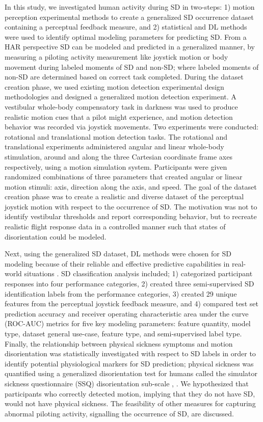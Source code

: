 \documentclass{ieeeaccess}
\begin{document}
\indent In this study, we investigated human activity during SD in two-steps: 1) motion perception experimental methods to create a generalized SD occurrence dataset containing a perceptual feedback measure, and 2) statistical and DL methods were used to identify optimal modeling parameters for predicting SD. From a HAR perspective SD can be modeled and predicted in a generalized manner, by measuring a piloting activity measurement like joystick motion or body movement during labeled moments of SD and non-SD; where labeled moments of non-SD are determined based on correct task completed. During the dataset creation phase, we used existing motion detection experimental design methodologies and designed a generalized motion detection experiment. A vestibular whole-body compensatory task in darkness was used to produce realistic motion cues that a pilot might experience, and motion detection behavior was recorded via joystick movements. Two experiments were conducted: rotational and translational motion detection tasks. The rotational and translational experiments administered angular and linear whole-body stimulation, around and along the three Cartesian coordinate frame axes respectively, using a motion simulation system. Participants were given randomized combinations of three parameters that created angular or linear motion stimuli: axis, direction along the axis, and speed. The goal of the dataset creation phase was to create a realistic and diverse dataset of the perceptual joystick motion with respect to the occurrence of SD. The motivation was not to identify vestibular thresholds and report corresponding behavior, but to recreate realistic flight response data in a controlled manner such that states of disorientation could be modeled. 

Next, using the generalized SD dataset, DL methods were chosen for SD modeling because of their reliable and effective predictive capabilities in real-world situations \cite{Dirgova_2022_Wearable, Xiao_2003_DeepLearning}. SD classification analysis included; 1) categorized participant responses into four performance categories, 2) created three semi-supervised SD identification labels from the performance categories, 3) created 29 unique features from the perceptual joystick feedback measure, and 4) compared test set prediction accuracy and receiver operating characteristic area under the curve (ROC-AUC) metrics for five key modeling parameters: feature quantity, model type, dataset general use-case, feature type, and semi-supervised label type. Finally, the relationship between physical sickness symptoms and motion disorientation was statistically investigated with respect to SD labels in order to identify potential physiological markers for SD prediction; physical sickness was quantified using a generalized disorientation test for humans called the simulator sickness questionnaire (SSQ) disorientation sub-scale \cite{Kennedy_1993_Simulator}, \cite{Bouchard_2007_SimulatorSickness}. We hypothesized that participants who correctly detected motion, implying that they do not have SD, would not have physical sickness. The feasibility of other measures for capturing abnormal piloting activity, signalling the occurrence of SD, are discussed.
\end{document}
